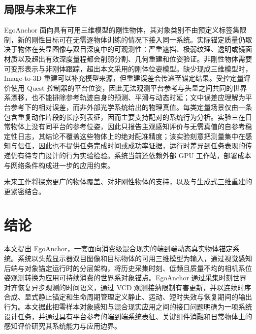 \documentclass[review]{vgtc}
\begin{document}
\subsection{局限与未来工作}


EgoAnchor 面向具有可用三维模型的刚性物体，其对象类别不由预定义标签集限制，新的刚性目标可在无需逐物体训练的情况下接入同一系统。实际锚定质量仍取决于物体在头显图像与双目深度中的可观测性：严重遮挡、极弱纹理、透明或镜面材质以及超出有效深度量程都会削弱分割、几何重建和位姿验证。非刚性物体需要可变形表示与非刚体跟踪，超出本文采用的刚体位姿模型。缺少现成三维模型时，Image-to-3D 重建可以补充模型来源，但重建误差会传递至锚定结果。受控定量评价使用 Quest 控制器的平台位姿，因此无法观测平台参考与头显之间共同的世界系漂移，也不能排除参考轨迹自身的预测、平滑与动态时延；文中误差应理解为平台参考下的相对误差，而非外部光学系统给出的物理真值。每类定量场景仅由一条包含重复动作片段的长序列表征，因而主要支持配对的系统行为分析。实验三在日常物体上没有同平台的参考位姿，因此只报告主观感知评价与无需真值的自参考稳定性日志，其结论不覆盖这些物体上的绝对配准精度；该实验刻意把测量集中在感知与信任，因此也不提供任务完成时间或成功率证据，运行时差异到任务表现的传递仍有待专门设计的行为实验检验。系统当前还依赖外部 GPU 工作站，部署成本与网络条件构成进一步的应用约束。

未来工作将探索更广的物体覆盖、对非刚性物体的支持，以及与生成式三维重建的更紧密结合。

\section{结论}\label{sec:conclusion}

本文提出 EgoAnchor，一套面向消费级混合现实的端到端动态真实物体锚定系统。系统以头戴显示器双目图像和目标物体的可用三维模型为输入，通过视觉感知后端与对象锚定运行时的分层架构，将历史采集时刻、低频且质量不均的相机系位姿观测转换为应用可持续消费的世界系对象锚点。EgoAnchor 通过采集时刻世界对齐恢复异步观测的时间语义，通过 VCD 观测接纳限制有害更新，并以连续时序合成、显式静止锚定和生命周期管理定义静止、运动、短时失效与恢复期间的输出行为。本文据此把零样本对象感知与混合现实应用之间的接口问题明确为一项系统设计任务，并通过具有平台参考的端到端系统表征、关键组件消融和日常物体上的感知评价研究其系统能力与应用边界。

\clearpage
\raggedbottom



\end{document}
